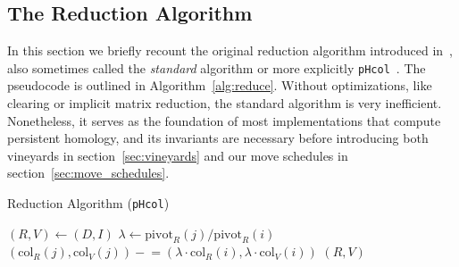 \documentclass{article} %
\begin{document}
\subsection{The Reduction Algorithm}\label{sec:reduction}
In this section we briefly recount the original reduction algorithm introduced in~\cite{zomorodian2005computing}, also sometimes called the \emph{standard} algorithm or more explicitly \texttt{pHcol}~\cite{de2011dualities}. 
The pseudocode is outlined in Algorithm~\ref{alg:reduce}. Without optimizations, like   clearing   or       implicit matrix reduction, the standard  algorithm is very inefficient. Nonetheless, it serves as the foundation of most implementations that compute persistent homology, and its invariants are necessary before introducing both vineyards in section~\ref{sec:vineyards} and our move schedules  in section~\ref{sec:move_schedules}.

\begin{algorithm}[t]
	\caption{Reduction Algorithm (\texttt{pHcol}) }
	\begin{algorithmic}[1]
		\State $(R, V) \gets (D, I)$
				\State $\lambda \gets \mathrm{pivot}_R(j)/\mathrm{pivot}_R(i)$
				\State $(\mathrm{col}_R(j), \mathrm{col}_V(j)) \mathrel{-}= \left ( \lambda \cdot \mathrm{col}_R(i), \lambda \cdot \mathrm{col}_V(i) \right )$
			\EndWhile
		\EndFor 
		\State \Return $(R, V)$
		\EndFunction
	\end{algorithmic}	\label{alg:reduce}
\end{algorithm}
\end{document}
